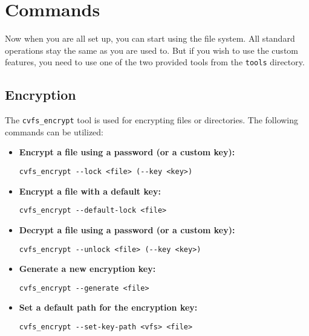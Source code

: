 \section*{Commands}

Now when you are all set up, you can start using the file system.
All standard operations stay the same as you are used to.
But if you wish to use the custom features, you need to use one of the two provided tools from the \texttt{tools} directory.

\subsection*{Encryption}

The \texttt{cvfs\_encrypt} tool is used for encrypting files or directories.
The following commands can be utilized:

\begin{itemize}
    \setlength\itemsep{-0.1em}
    \item \textbf{Encrypt a file using a password (or a custom key):} \\
    \begin{BVerbatim}[baseline=t,boxwidth=10cm]
  cvfs_encrypt --lock <file> (--key <key>)
    \end{BVerbatim}

    \item \textbf{Encrypt a file with a default key:} \\
    \begin{BVerbatim}[baseline=t,boxwidth=10cm]
  cvfs_encrypt --default-lock <file>
    \end{BVerbatim}

    \item \textbf{Decrypt a file using a password (or a custom key):} \\
    \begin{BVerbatim}[baseline=t,boxwidth=10cm]
  cvfs_encrypt --unlock <file> (--key <key>)
    \end{BVerbatim}

    \item \textbf{Generate a new encryption key:} \\
    \begin{BVerbatim}[baseline=t,boxwidth=10cm]
  cvfs_encrypt --generate <file>
    \end{BVerbatim}

    \item \textbf{Set a default path for the encryption key:} \\
    \begin{BVerbatim}[baseline=t,boxwidth=10cm]
  cvfs_encrypt --set-key-path <vfs> <file>
    \end{BVerbatim}
\end{itemize}

